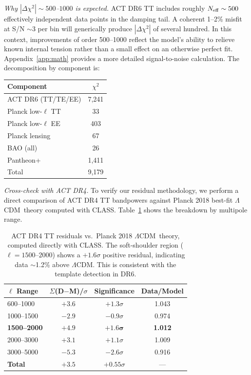 \documentclass[twocolumn,showpacs,preprintnumbers,amsmath,amssymb,prd]{revtex4-2}
\newcommand{\lcdm}{$\Lambda$CDM}
\begin{document}
\emph{Why $|\Delta\chi^2| \sim 500$--$1000$ is expected.} ACT DR6 TT includes 
roughly $N_{\rm eff} \sim 500$ effectively independent data points in the 
damping tail. A coherent 1--2\% misfit at S/N $\sim 3$ per bin will generically 
produce $|\Delta\chi^2|$ of several hundred. In this context, improvements of 
order 500--1000 reflect the model's ability to relieve known internal tension 
rather than a small effect on an otherwise perfect fit. Appendix~\ref{app:math} 
provides a more detailed signal-to-noise calculation. The decomposition by 
component is:
\begin{center}
\begin{tabular}{lc}
\toprule
Component & $\chi^2$ \\
\midrule
ACT DR6 (TT/TE/EE) & 7,241 \\
Planck low-$\ell$ TT & 33 \\
Planck low-$\ell$ EE & 403 \\
Planck lensing & 67 \\
BAO (all) & 26 \\
Pantheon+ & 1,411 \\
\midrule
Total & 9,179 \\
\bottomrule
\end{tabular}
\end{center}

\emph{Cross-check with ACT DR4.} To verify our residual methodology, 
we perform a direct comparison of ACT DR4 TT bandpowers against 
Planck 2018 best-fit \lcdm\ theory computed with \textsc{CLASS}. 
Table~\ref{tab:dr4_residuals} shows the breakdown by multipole range.

\begin{table}[t]
\centering
\caption{ACT DR4 TT residuals vs.\ Planck 2018 \lcdm\ theory, 
computed directly with \textsc{CLASS}. The soft-shoulder region 
($\ell = 1500$--$2000$) shows a $+1.6\sigma$ positive residual, 
indicating data $\sim$1.2\% above \lcdm. This is consistent with 
the template detection in DR6.}
\begin{tabular}{lccc}
\toprule
$\ell$ Range & $\Sigma$(D$-$M)/$\sigma$ & Significance & Data/Model \\
\midrule
600--1000 & $+3.6$ & $+1.3\sigma$ & 1.043 \\
1000--1500 & $-2.9$ & $-0.9\sigma$ & 0.974 \\
\textbf{1500--2000} & $\mathbf{+4.9}$ & $\mathbf{+1.6\sigma}$ & \textbf{1.012} \\
2000--3000 & $+3.1$ & $+1.1\sigma$ & 1.009 \\
3000--5000 & $-5.3$ & $-2.6\sigma$ & 0.916 \\
\midrule
\textbf{Total} & $+3.5$ & $+0.55\sigma$ & --- \\
\bottomrule
\end{tabular}
\label{tab:dr4_residuals}
\end{table}
\end{document}
